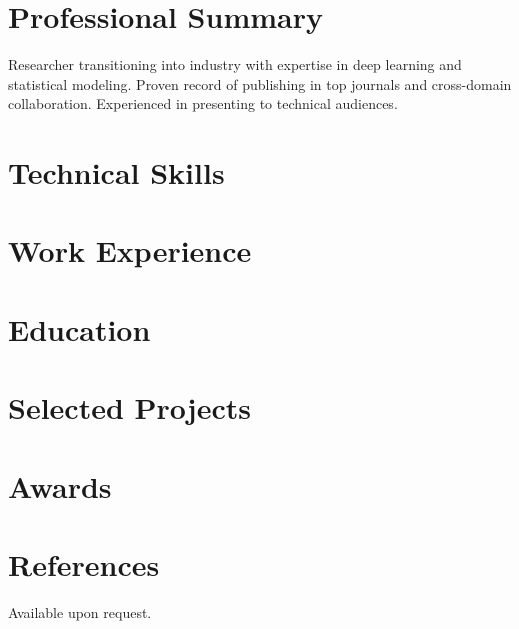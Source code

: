 \documentclass[11pt,a4paper]{article}
\newcommand{\cvsection}[1]{\section*{#1}}
\begin{document}


\cvsection{Professional Summary}
Researcher transitioning into industry with expertise in deep learning and statistical modeling.
Proven record of publishing in top journals and cross-domain collaboration.
Experienced in presenting to technical audiences.

\cvsection{Technical Skills}


\cvsection{Work Experience}


\cvsection{Education}


\cvsection{Selected Projects}
%


\cvsection{Awards}


\cvsection{References}
Available upon request.
\end{document}
